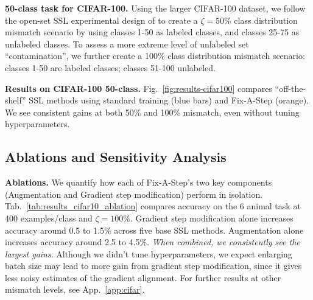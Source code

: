 \textbf{50-class task for CIFAR-100.}
Using the larger CIFAR-100 dataset, we follow the open-set SSL experimental design of \citet{chenSemiSupervisedLearningClass2020} to create a $\zeta = 50\%$ class distribution mismatch scenario by using classes 1-50 as labeled classes, and classes 25-75 as unlabeled classes. 
To assess a more extreme level of unlabeled set ``contamination'', we further create a 100\% class distribution mismatch scenario: classes 1-50 are labeled classes; classes 51-100 unlabeled. 




\textbf{Results on CIFAR-100 50-class.}
Fig.~\ref{fig:results-cifar100} compares ``off-the-shelf'' SSL methods using standard training (blue bars) and Fix-A-Step (orange).
We see consistent gains at both 50\% and 100\% mismatch,
even without tuning hyperparameters.

\subsection{Ablations and Sensitivity Analysis}

\textbf{Ablations.}
We quantify how each of Fix-A-Step's two key components (Augmentation and Gradient step modification) perform in isolation.
Tab.~\ref{tab:results_cifar10_ablation} compares accuracy on the 6 animal task at 400 examples/class and $\zeta = 100\%$. 
Gradient step modification alone increases accuracy around 0.5 to 1.5\% across five base SSL methods.
Augmentation alone increases accuracy around 2.5 to 4.5\%. \emph{When combined, we consistently see the largest gains}. Although we didn't tune hyperparameters, we expect enlarging batch size may lead to more gain from gradient step modification, since it gives less noisy estimates of the gradient alignment.
For further results at other mismatch levels, see App.~\ref{app:cifar}. 

